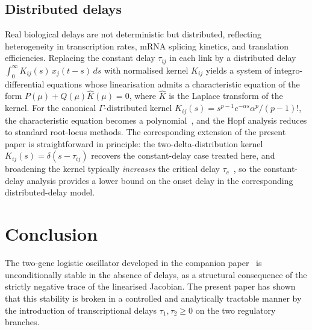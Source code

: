\documentclass[sn-mathphys,Numbered]{sn-jnl}
\theoremstyle{thmstyleone}
\theoremstyle{thmstyletwo}
\theoremstyle{thmstylethree}
\begin{document}
\subsection{Distributed delays}

Real biological delays are not deterministic but distributed, reflecting
heterogeneity in transcription rates, mRNA splicing kinetics, and
translation efficiencies. Replacing the constant delay $\tau_{ij}$ in
each link by a distributed delay
$\int_0^\infty K_{ij}(s)\,x_j(t-s)\,ds$ with normalised kernel $K_{ij}$
yields a system of integro-differential equations whose linearisation
admits a characteristic equation of the form
$P(\mu)+Q(\mu)\hat{K}(\mu)=0$, where $\hat{K}$ is the Laplace
transform of the kernel. For the canonical $\Gamma$-distributed
kernel $K_{ij}(s)=s^{p-1}e^{-\alpha s}\alpha^p/(p-1)!$, the characteristic
equation becomes a polynomial~\cite{macdonald1989biological}, and the
Hopf analysis reduces to standard root-locus methods. The corresponding
extension of the present paper is straightforward in principle: the
two-delta-distribution kernel $K_{ij}(s)=\delta(s-\tau_{ij})$ recovers
the constant-delay case treated here, and broadening the kernel
typically \emph{increases} the critical delay
$\tau_c$~\cite{beretta2002geometric,macdonald1989biological}, so the
constant-delay analysis provides a lower bound on the onset delay in
the corresponding distributed-delay model.

\section{Conclusion}
\label{sec:conclusion}

The two-gene logistic oscillator developed in the companion
paper~\cite{belgacem2026logistic} is unconditionally stable in the absence
of delays, as a structural consequence of the strictly negative trace of
the linearised Jacobian. The present paper has shown that this stability
is broken in a controlled and analytically tractable manner by the
introduction of transcriptional delays $\tau_1,\tau_2\geq 0$ on the two
regulatory branches.
\end{document}
